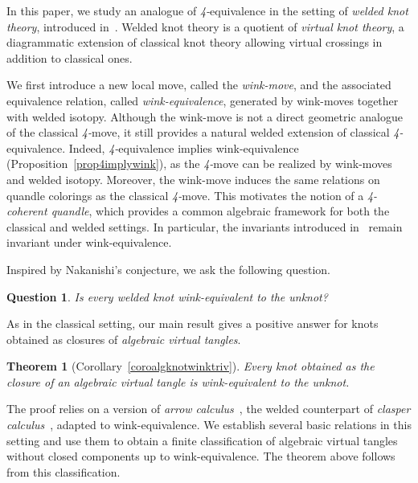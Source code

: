 \documentclass[11pt, a4paper, twoside,reqno]{amsart}
\theoremstyle{plain}
\newtheorem*{thm0}{Theorem}
\newtheorem*{ques}{Question}
\theoremstyle{definition}
\theoremstyle{remark}
\begin{document}
In this paper, we study an analogue of \textit{4-}equivalence in the setting of \emph{welded knot theory}, introduced in~\cite{FennRimanyiRourkeBraidPermuGrp}. Welded knot theory is a quotient of \emph{virtual knot theory}, a diagrammatic extension of classical knot theory allowing virtual crossings in addition to classical ones.
 
We first introduce a new local move, called the \textit{wink-move}, and the associated equivalence relation, called \textit{wink-equivalence}, generated by wink-moves together with welded isotopy. Although the wink-move is not a direct geometric analogue of the classical \textit{4-}move, it still provides a natural welded extension of classical \textit{4-}equivalence. Indeed, \textit{4-}equivalence implies wink-equivalence (Proposition~\ref{prop4implywink}), as the \textit{4-}move can be realized by wink-moves and welded isotopy. Moreover, the wink-move induces the same relations on quandle colorings as the classical \textit{4-}move. This motivates the notion of a \emph{\textit{4-}coherent quandle}, which provides a common algebraic framework for both the classical and welded settings. In particular, the invariants introduced in~\cite{DabkowskiPrzytyckiUnexpConnBetweenBurnsideGrpsKnotTheory,DabkowskiSahiInv4moves,BrittenhamHermillerTodd4movesDaboSahiInvKnot} remain invariant under wink-equivalence.

Inspired by Nakanishi's conjecture, we ask the following question.

\begin{ques}
Is every welded knot wink-equivalent to the unknot?
\end{ques}

As in the classical setting, our main result gives a positive answer for knots obtained as closures of \emph{algebraic virtual tangles}.

\begin{thm0}[Corollary~\ref{coroalgknotwinktriv}]
Every knot obtained as the closure of an algebraic virtual tangle is wink-equivalent to the unknot.
\end{thm0}

The proof relies on a version of \emph{arrow calculus}~\cite{JBYasuArrowcalc}, the welded counterpart of \emph{clasper calculus}~\cite{HabiroClasp}, adapted to wink-equivalence. We establish several basic relations in this setting and use them to obtain a finite classification of algebraic virtual tangles without closed components up to wink-equivalence. The theorem above follows from this classification.
\end{document}

